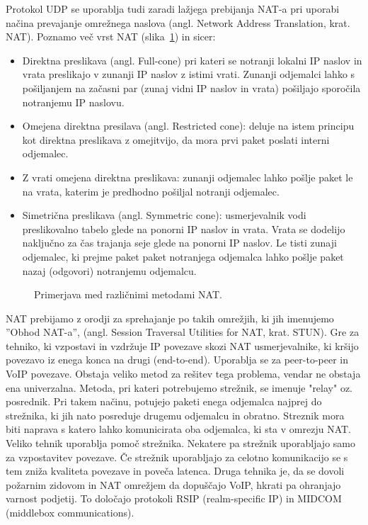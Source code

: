 \documentclass{acm_proc_article-sp}
\begin{document}
Protokol UDP\cite{UDP} se uporablja tudi zaradi lažjega prebijanja NAT-a pri uporabi načina prevajanje omrežnega naslova (angl. Network Address Translation, krat. NAT). Poznamo več vrst NAT (slika~\ref{fig:nat}) in sicer:
\begin{itemize}
  \item Direktna preslikava (angl. Full-cone) pri kateri se notranji lokalni IP naslov in vrata preslikajo v zunanji IP naslov z istimi vrati. Zunanji odjemalci lahko s pošiljanjem na začasni par (zunaj vidni IP naslov in vrata) pošiljajo sporočila notranjemu IP naslovu.
  \item Omejena direktna presilava (angl. Restricted cone): deluje na istem principu kot direktna preslikava z omejitvijo, da mora prvi paket poslati interni odjemalec.
  \item Z vrati omejena direktna preslikava: zunanji odjemalec lahko pošlje paket le na vrata, katerim je predhodno pošiljal notranji odjemalec.
  \item Simetrična preslikava (angl. Symmetric cone): usmerjevalnik vodi preslikovalno tabelo glede na ponorni IP naslov in vrata. Vrata se dodelijo naključno za čas trajanja seje glede na ponorni IP naslov. Le tisti zunaji odjemalec, ki prejme paket paket notranjega odjemalca lahko pošlje paket nazaj (odgovori) notranjemu odjemalcu.
\end{itemize}

\begin{figure}
\centering
{} %
\caption{Primerjava med različnimi metodami NAT.}
\label{fig:nat}
\end{figure}

NAT prebijamo\cite{NAT-FIREWALL} z orodji za sprehajanje po takih omrežjih, ki jih imenujemo ''Obhod NAT-a'', (angl. Session Traversal Utilities for NAT, krat. STUN\cite{STUN}). Gre za tehniko, ki vzpostavi in vzdržuje IP povezave skozi NAT usmerjevalnike, ki kršijo povezavo iz enega konca na drugi (end-to-end). Uporablja se za peer-to-peer in VoIP povezave. Obstaja veliko metod za rešitev tega problema, vendar ne obstaja ena univerzalna. Metoda, pri kateri potrebujemo strežnik, se imenuje "relay" oz. posrednik. Pri takem načinu, potujejo paketi enega odjemalca najprej do strežnika, ki jih nato posreduje drugemu odjemalcu in obratno. Streznik mora biti naprava s katero lahko komunicirata oba odjemalca, ki sta v omrezju NAT. Veliko tehnik uporablja pomoč strežnika. Nekatere pa strežnik uporabljajo samo za vzpostavitev povezave. Če strežnik uporabljajo za celotno komunikacijo se s tem zniža kvaliteta povezave in poveča latenca. Druga tehnika je, da se dovoli požarnim zidovom in NAT omrežjem da dopuščajo VoIP, hkrati pa ohranjajo varnost podjetij. To določajo protokoli RSIP (realm-specific IP) in MIDCOM (middlebox communications).
\end{document}
